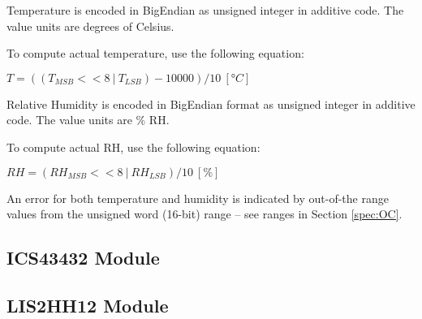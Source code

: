   Temperature is encoded in BigEndian as unsigned integer in additive code. The value units are degrees of Celsius.
  
  To compute actual temperature, use the following equation:
  
  $T = ((T_{MSB} << 8 ~|~ T_{LSB}) - 10000) / 10 ~[°C]$
  
  Relative Humidity is encoded in BigEndian format as unsigned integer in additive code. The value units are \% RH.
  
  To compute actual RH, use the following equation:
  
  $RH = (RH_{MSB} << 8 ~|~ RH_{LSB}) / 10 ~[\%]$
  
  An error for both temperature and humidity is indicated by out-of-the range values from the unsigned word (16-bit) range -- see ranges in Section \ref{spec:OC}.
  

\clearpage
\subsection{ICS43432 Module}



\clearpage
\subsection{LIS2HH12 Module}

  
  




  




